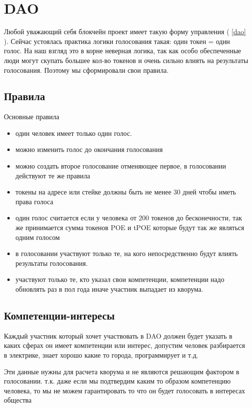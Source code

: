\documentclass[a4paper,12pt]{report}
\begin{document}
\chapter{DAO}

Любой уважающий себя блокчейн проект имеет такую форму управления ( \ref{dao} ). Сейчас устоялась практика логики голосования такая: один токен = один голос. На наш взгляд это в корне неверная логика, так как особо обеспеченные люди могут скупать большее кол-во токенов и очень сильно влиять на результаты голосования. Поэтому мы сформировали свои правила.

\section{Правила}

Основные правила

\begin{itemize}
	\item один человек имеет только один голос.
	\item можно изменить голос до окончания голосования
	\item можно создать второе голосование отменяющее первое, в голосовании действуют те же правила
	\item токены на адресе или стейке должны быть не менее 30 дней чтобы иметь права голоса
	\item один голос считается если у человека от 200 токенов до бесконечности, так же принимается сумма токенов POE и tPOE которые будут так же являться одним голосом
	\item в голосовании участвуют только те, на кого непосредственно будут влиять результаты голосования.
	\item участвуют только те, кто указал свои компетенции, компетенции надо обновлять раз в пол года иначе участник выпадает из кворума.
	
\end{itemize}


\section{Компетенции-интересы}
Каждый участник который хочет участвовать в DAO должен будет указать в каких сферах он имеет компетенции или интерес, допустим человек разбирается в электрике, знает хорошо какие то города, программирует и т.д.

Эти данные нужны для расчета кворума и не являются решающим фактором в голосовании.  т.к. даже если мы подтвердим каким то образом компетенцию человека, то мы не можем гарантировать то что он будет голосовать в интересах общества
\end{document}
